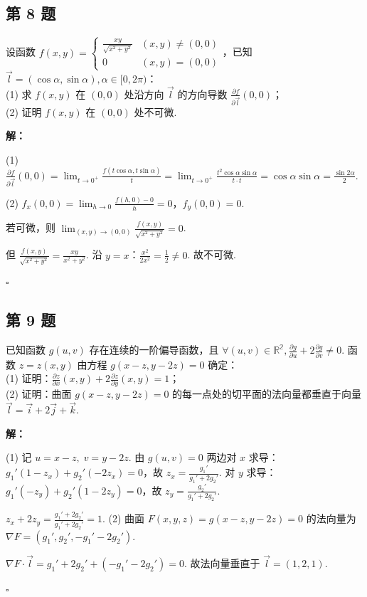 \documentclass[12pt,a4paper]{article}
\newenvironment{sol}[1][解]{%
  \par\medskip\noindent\textbf{#1：}\itshape\par\noindent\ignorespaces
}{%
  \par\hfill$\square$\par\medskip
}
\begin{document}
\subsection*{第 8 题}
设函数 $f(x,y)=
\begin{cases}\frac{xy}{\sqrt{x^2+y^2}} & (x,y)\ne(0,0) \\ 0 & (x,y)=(0,0)
\end{cases}$，已知 $\vec{l}=(\cos\alpha,\sin\alpha), \alpha\in[0,2\pi)$：\\
(1) 求 $f(x,y)$ 在 $(0,0)$ 处沿方向 $\vec{l}$ 的方向导数 $\frac{\partial
f}{\partial \vec{l}}(0,0)$；\\
(2) 证明 $f(x,y)$ 在 $(0,0)$ 处不可微.

\begin{sol}(1) $\frac{\partial f}{\partial\vec{l}}(0,0)=\lim_{t\to
  0^+}\frac{f(t\cos\alpha,t\sin\alpha)}{t}=\lim_{t\to
  0^+}\frac{t^2\cos\alpha\sin\alpha}{t\cdot
  t}=\cos\alpha\sin\alpha=\frac{\sin 2\alpha}{2}.$

  (2) $f_x(0,0)=\lim_{h\to 0}\frac{f(h,0)-0}{h}=0$，$f_y(0,0)=0$.

  若可微，则 $\lim_{(x,y)\to(0,0)}\frac{f(x,y)}{\sqrt{x^2+y^2}}=0$.

  但 $\frac{f(x,y)}{\sqrt{x^2+y^2}}=\frac{xy}{x^2+y^2}$. 沿
  $y=x$：$\frac{x^2}{2x^2}=\frac{1}{2}\ne 0$. 故不可微.

\end{sol}
\subsection*{第 9 题}
已知函数 $g(u,v)$ 存在连续的一阶偏导函数，且 $\forall (u,v)\in\mathbb{R^2},
\frac{\partial g}{\partial u}+2\frac{\partial g}{\partial v}\ne0$. 函数
$z=z(x,y)$ 由方程 $g(x-z, y-2z)=0$ 确定：\\
(1) 证明：$\frac{\partial z}{\partial x}(x,y)+2\frac{\partial
z}{\partial y}(x,y)=1$；\\
(2) 证明：曲面 $g(x-z, y-2z)=0$ 的每一点处的切平面的法向量都垂直于向量
$\vec{l}=\vec{i}+2\vec{j}+\vec{k}$.

\begin{sol}(1) 记 $u=x-z,\; v=y-2z$. 由 $g(u,v)=0$ 两边对 $x$
  求导：$g_1'(1-z_x)+g_2'(-2z_x)=0$，故 $z_x=\frac{g_1'}{g_1'+2g_2'}$. 对 $y$
  求导：$g_1'(-z_y)+g_2'(1-2z_y)=0$，故 $z_y=\frac{g_2'}{g_1'+2g_2'}$.

  $z_x+2z_y=\frac{g_1'+2g_2'}{g_1'+2g_2'}=1.$
  (2) 曲面 $F(x,y,z)=g(x-z,y-2z)=0$ 的法向量为 $\nabla F=(g_1',g_2',-g_1'-2g_2')$.

  $\nabla F\cdot\vec{l}=g_1'+2g_2'+(-g_1'-2g_2')=0$. 故法向量垂直于
  $\vec{l}=(1,2,1)$.
\end{sol}
\end{document}
